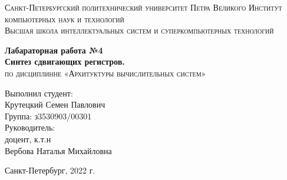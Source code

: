\begin{titlepage}
    \begin{center}
        \textsc{
            Санкт-Петербургский политехнический университет Петра Великого Институт компьютерных наук и технологий \\[5mm]
            Высшая школа интеллектуальных систем и суперкомпьютерных технологий    
        }

        \vfill

        \textbf{
            Лабараторная работа №4 \\[2mm]
            Синтез сдвигающих регистров. \\
        }
        \textsc{
            по дисциплинне «Архитуктуры вычислительных систем»
        }
    \end{center}

    \hfill

    \begin{flushright}
        \begin{minipage}{0.35\textwidth}
            Выполнил студент: \\[2mm]
            Крутецкий Семен Павлович \\
            Группа: з3530903/00301 \\[15mm]
            Руководитель:\\[2mm] 
            доцент, к.т.н \\
            Вербова Наталья Михайловна
        \end{minipage}
    \end{flushright}
    
    \vfill

    \begin{center}
        Санкт-Петербург, 2022 г.
    \end{center}
\end{titlepage}

\newpage

\tableofcontents
\newpage